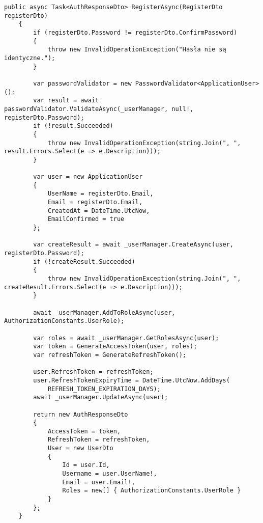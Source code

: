 \begin{lstlisting}[style=csharp, caption={Implementacja rejestracji},label={lst:rejestracja}]
	public async Task<AuthResponseDto> RegisterAsync(RegisterDto registerDto)
	{
		if (registerDto.Password != registerDto.ConfirmPassword)
		{
			throw new InvalidOperationException("Hasła nie są identyczne.");
		}
		
		var passwordValidator = new PasswordValidator<ApplicationUser>();
		var result = await passwordValidator.ValidateAsync(_userManager, null!, registerDto.Password);
		if (!result.Succeeded)
		{
			throw new InvalidOperationException(string.Join(", ", result.Errors.Select(e => e.Description)));
		}
		
		var user = new ApplicationUser
		{
			UserName = registerDto.Email,
			Email = registerDto.Email,
			CreatedAt = DateTime.UtcNow,
			EmailConfirmed = true
		};
		
		var createResult = await _userManager.CreateAsync(user, registerDto.Password);
		if (!createResult.Succeeded)
		{
			throw new InvalidOperationException(string.Join(", ", createResult.Errors.Select(e => e.Description)));
		}
		
		await _userManager.AddToRoleAsync(user, AuthorizationConstants.UserRole);
		
		var roles = await _userManager.GetRolesAsync(user);
		var token = GenerateAccessToken(user, roles);
		var refreshToken = GenerateRefreshToken();
		
		user.RefreshToken = refreshToken;
		user.RefreshTokenExpiryTime = DateTime.UtcNow.AddDays(
			REFRESH_TOKEN_EXPIRATION_DAYS);
		await _userManager.UpdateAsync(user);
		
		return new AuthResponseDto
		{
			AccessToken = token,
			RefreshToken = refreshToken,
			User = new UserDto
			{
				Id = user.Id,
				Username = user.UserName!,
				Email = user.Email!,
				Roles = new[] { AuthorizationConstants.UserRole }
			}
		};
	}
\end{lstlisting}


